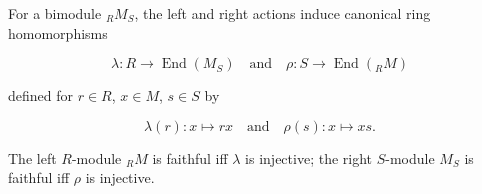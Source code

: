 For a bimodule $_R M_S$, the left and right actions induce canonical ring homomorphisms

$$\lambda: R \rightarrow \operatorname{End}(M_S) \quad \text{and} \quad \rho: S \rightarrow \operatorname{End}(_R M)$$

defined for $r \in R$, $x \in M$, $s \in S$ by

$$\lambda(r): x \mapsto rx \quad \text{and} \quad \rho(s): x \mapsto xs.$$

The left $R$-module $_R M$ is faithful iff $\lambda$ is injective; the right $S$-module $M_S$ is faithful iff $\rho$ is injective.
